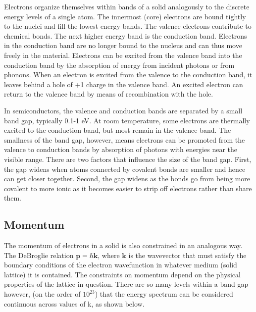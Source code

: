 \documentclass{article}
\renewcommand{\vec}[1]{\mathbf{#1}}
\begin{document}
\hspace{.25cm}

Electrons organize themselves within bands of a solid analogously to the discrete energy levels of a single atom. The innermost (core) electrons are bound tightly to the nuclei and fill the lowest energy bands. The valence electrons contribute to chemical bonds. The next higher energy band is the conduction band. Electrons in the conduction band are no longer bound to the nucleus and can thus move freely in the material. Electrons can be excited from the valence band into the conduction band by the absorption of energy from incident photons or from phonons. When an electron is excited from the valence to the conduction band, it leaves behind a hole of +1 charge in the valence band. An excited electron can return to the valence band by means of recombination with the hole.

\hspace{.25cm}

In semiconductors, the valence and conduction bands are separated by a small band gap, typically 0.1-1 eV. At room temperature, some electrons are thermally excited to the conduction band, but most remain in the valence band. The smallness of the band gap, however, means electrons can be promoted from the valence to conduction bands by absorption of photons with energies near the visible range. There are two factors that influence the size of the band gap. First, the gap widens when atoms connected by covalent bonds are smaller and hence can get closer together. Second, the gap widens as the bonds go from being more covalent to more ionic as it becomes easier to strip off electrons rather than share them.\cite{lab manual}

\hspace{.25cm}

\subsection{Momentum}

The momentum of electrons in a solid is also constrained in an analogous way. The DeBroglie relation $\vec{p} = \hbar \vec{k}$, where $\vec{k}$ is the wavevector that must satisfy the boundary conditions of the electron wavefunction in whatever medium (solid lattice) it is contained. The constraints on momentum depend on the physical properties of the lattice in question. There are so many levels within a band gap however, (on the order of $10^{23}$) that the energy spectrum can be considered continuous across values of k, as shown below.
\end{document}
